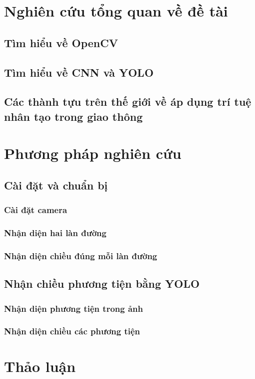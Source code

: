 \documentclass[12pt,twoside,a4paper]{article}
\begin{document}
\section{Nghiên cứu tổng quan về đề tài}
\subsection{Tìm hiểu về OpenCV}
\subsection{Tìm hiểu về CNN và YOLO}
\subsection{Các thành tựu trên thế giới về áp dụng trí tuệ nhân tạo trong giao thông}
\section{Phương pháp nghiên cứu}
\subsection{Cài đặt và chuẩn bị}
\subsubsection{Cài đặt camera}
\subsubsection{Nhận diện hai làn đường}
\subsubsection{Nhận diện chiều đúng mỗi làn đường}
\subsection{Nhận chiều phương tiện bằng YOLO}
\subsubsection{Nhận diện phương tiện trong ảnh}
\subsubsection{Nhận diện chiều các phương tiện}
\pagebreak
\section{Thảo luận}
\end{document}
